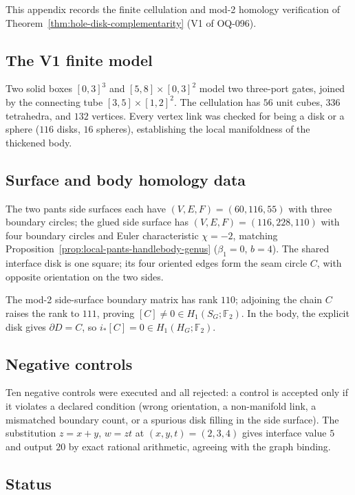 
This appendix records the finite cellulation and mod-2 homology verification of
Theorem~\ref{thm:hole-disk-complementarity} (V1 of OQ-096).

\subsection{The V1 finite model}

Two solid boxes $[0,3]^3$ and $[5,8]\times[0,3]^2$ model two three-port gates,
joined by the connecting tube $[3,5]\times[1,2]^2$.  The cellulation has $56$
unit cubes, $336$ tetrahedra, and $132$ vertices.  Every vertex link was checked
for being a disk or a sphere ($116$ disks, $16$ spheres), establishing the
local manifoldness of the thickened body.

\subsection{Surface and body homology data}

The two pants side surfaces each have $(V,E,F)=(60,116,55)$ with three boundary
circles; the glued side surface has $(V,E,F)=(116,228,110)$ with four boundary
circles and Euler characteristic $\chi=-2$, matching
Proposition~\ref{prop:local-pants-handlebody-genus} ($\beta_1=0$, $b=4$).  The
shared interface disk is one square; its four oriented edges form the seam
circle $C$, with opposite orientation on the two sides.

The mod-2 side-surface boundary matrix has rank $110$; adjoining the chain $C$
raises the rank to $111$, proving
$[C]\neq0\in H_1(S_G;\mathbb F_2)$.  In the body, the explicit disk gives
$\partial D=C$, so $i_*[C]=0\in H_1(H_G;\mathbb F_2)$.

\subsection{Negative controls}

Ten negative controls were executed and all rejected: a control is accepted only
if it violates a declared condition (wrong orientation, a non-manifold link, a
mismatched boundary count, or a spurious disk filling in the side surface).
The substitution $z=x+y$, $w=zt$ at $(x,y,t)=(2,3,4)$ gives interface value $5$
and output $20$ by exact rational arithmetic, agreeing with the graph binding.

\subsection{Status}


